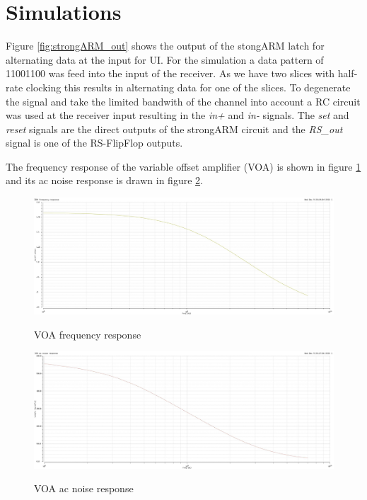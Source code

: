 \section{Simulations}
\label{sec:simulations}
Figure \ref{fig:strongARM_out} shows the output of the stongARM latch for alternating data at the input for \unit[6]{UI}. For the simulation a data pattern of 11001100 was feed into the input of the receiver. As we have two slices with half-rate clocking this results in alternating data for one of the slices. To degenerate the signal and take the limited bandwith of the channel into account a RC circuit was used at the receiver input resulting in the \textit{in+} and \textit{in-} signals. The \textit{set} and \textit{reset} signals are the direct outputs of the strongARM circuit and the \textit{RS\_out} signal is one of the RS-FlipFlop outputs.

The frequency response of the variable offset amplifier (VOA) is shown in figure \ref{fig:voa_freq} and its ac noise response is drawn in figure \ref{fig:voa_noise}.

\begin{figure}[H]
  \centering
  {\includegraphics[scale=0.35]{img/voa_freq.jpg}}
  \caption{VOA frequency response}
  \label{fig:voa_freq}
\end{figure}

\begin{figure}[H]
  \centering
  {\includegraphics[scale=0.35]{img/voa_noise.jpg}}
  \caption{VOA ac noise response}
  \label{fig:voa_noise}
\end{figure}

